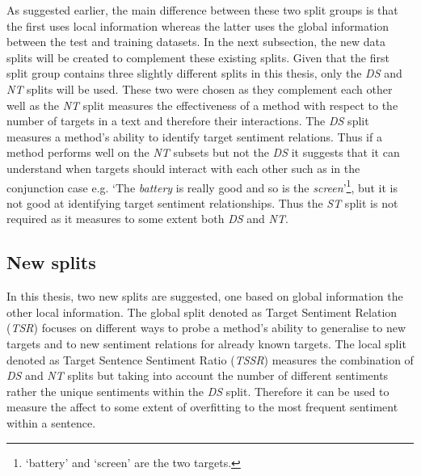 As suggested earlier, the main difference between these two split groups is that the first uses local information whereas the latter uses the global information between the test and training datasets. In the next subsection, the new data splits will be created to complement these existing splits. Given that the first split group contains three slightly different splits in this thesis, only the \textit{DS} and \textit{NT} splits will be used. These two were chosen as they complement each other well as the \textit{NT} split measures the effectiveness of a method with respect to the number of targets in a text and therefore their interactions. The \textit{DS} split measures a method's ability to identify target sentiment relations. Thus if a method performs well on the \textit{NT} subsets but not the \textit{DS} it suggests that it can understand when targets should interact with each other such as in the conjunction case e.g. `The \textit{battery} is really good and so is the \textit{screen}'\footnote{`battery' and `screen' are the two targets.}, but it is not good at identifying target sentiment relationships. Thus the \textit{ST} split is not required as it measures to some extent both \textit{DS} and \textit{NT}.

\subsection{New splits}
\label{section:error_analysis_new_splits}

In this thesis, two new splits are suggested, one based on global information the other local information. The global split denoted as Target Sentiment Relation (\textit{TSR}) focuses on different ways to probe a method's ability to generalise to new targets and to new sentiment relations for already known targets. The local split denoted as Target Sentence Sentiment Ratio (\textit{TSSR}) measures the combination of \textit{DS} and \textit{NT} splits but taking into account the number of different sentiments rather the unique sentiments within the \textit{DS} split. Therefore it can be used to measure the affect to some extent of overfitting to the most frequent sentiment within a sentence. 

